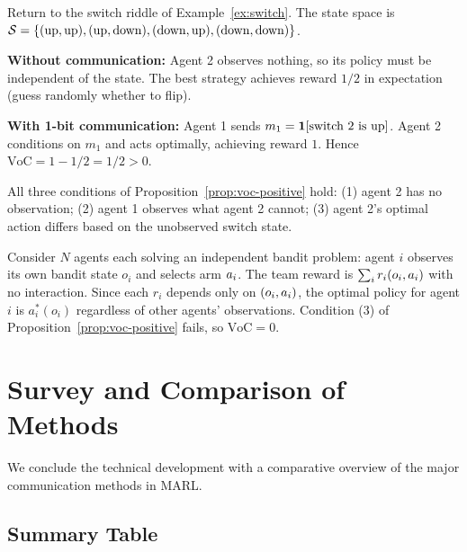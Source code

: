 \documentclass[11pt,a4paper]{article}
\begin{document}
\begin{example}
\label{ex:voc-switch}
Return to the switch riddle of Example~\ref{ex:switch}.
The state space is $\mathcal{S} = \{(\text{up}, \text{up}),
(\text{up}, \text{down}), (\text{down}, \text{up}),
(\text{down}, \text{down})\}$.

\textbf{Without communication:}  Agent 2 observes nothing,
so its policy must be independent of the state.  The best
strategy achieves reward $1/2$ in expectation (guess randomly
whether to flip).

\textbf{With 1-bit communication:}  Agent 1 sends $m_1 =
\mathbf{1}[\text{switch 2 is up}]$.  Agent 2 conditions on
$m_1$ and acts optimally, achieving reward $1$.  Hence
$\mathrm{VoC} = 1 - 1/2 = 1/2 > 0$.

All three conditions of Proposition~\ref{prop:voc-positive}
hold: (1) agent 2 has no observation; (2) agent 1 observes
what agent 2 cannot; (3) agent 2's optimal action differs
based on the unobserved switch state.
\end{example}

\begin{example}[VoC = 0 in Independent Tasks]
\label{ex:voc-zero}
Consider $N$ agents each solving an independent bandit problem:
agent $i$ observes its own bandit state $o_i$ and selects arm
$a_i$.  The team reward is $\sum_i r_i(o_i, a_i)$
with no interaction.  Since each $r_i$ depends only on $(o_i,
a_i)$, the optimal policy for agent $i$ is $a_i^*(o_i)$
regardless of other agents' observations.  Condition (3) of
Proposition~\ref{prop:voc-positive} fails, so $\mathrm{VoC} =
0$.
\end{example}

\section{Survey and Comparison of Methods}
\label{sec:survey}

We conclude the technical development with a comparative overview
of the major communication methods in MARL.

\subsection{Summary Table}
\end{document}
